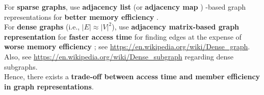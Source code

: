 For {\bf sparse graphs}, use {\bf adjacency list} (or {\bf adjacency map} \cite{Goodrich2013}) -based graph representations for {\bf better memory efficiency} \cite{WikipediaContributors2018a49}. \\




For {\bf dense graphs} (i.e., $| E | \approx | V |^{2}$), use {\bf adjacency matrix-based graph representation} for {\bf faster access time} for finding edges at the expense of {\bf worse memory efficiency} \cite{WikipediaContributors2018a49}; see \url{https://en.wikipedia.org/wiki/Dense_graph}. Also, see \url{https://en.wikipedia.org/wiki/Dense_subgraph} regarding dense subgraphs. \\

Hence, there exists a {\bf trade-off between access time and member efficiency in graph representations}.\\

